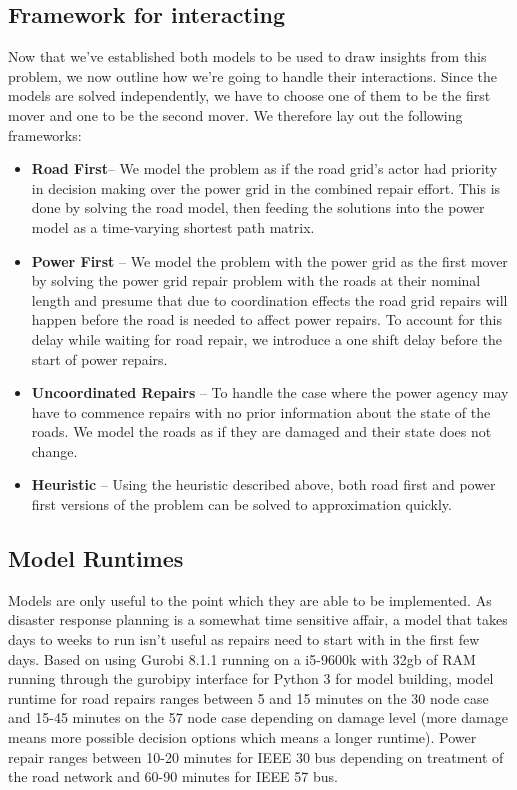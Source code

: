\documentclass{article}
\begin{document}
	\subsection{Framework for interacting}
	Now that we've established both models to be used to draw insights from this problem, we now outline how we're going to handle their interactions. Since the models are solved independently, we have to choose one of them to be the first mover and one to be the second mover. We therefore lay out the following frameworks:
	\begin{itemize}
		\item \textbf{Road First}-- We model the problem as if the road grid's actor had priority in decision making over the power grid in the combined repair effort. This is done by solving the road model, then feeding the solutions into the power model as a time-varying shortest path matrix.
		\item \textbf{Power First} -- We model the problem with the power grid as the first mover by solving the power grid repair problem with the roads at their nominal length and presume that due to coordination effects the road grid repairs will happen before the road is needed to affect power repairs. To account for this delay while waiting for road repair, we introduce a one shift delay before the start of power repairs.
		\item \textbf{Uncoordinated Repairs} -- To handle the case where the power agency may have to commence repairs with no prior information about the state of the roads. We model the roads as if they are damaged and their state does not change.
		\item \textbf{Heuristic} -- Using the heuristic described above, both road first and power first versions of the problem can be solved to approximation quickly.
	\end{itemize}
	\subsection{Model Runtimes}
	Models are only useful to the point which they are able to be implemented. As disaster response planning is a somewhat time sensitive affair, a model that takes days to weeks to run isn't useful as repairs need to start with in the first few days. Based on using Gurobi 8.1.1 running on a i5-9600k with 32gb of RAM running through the gurobipy interface for Python 3 for model building, model runtime for road repairs ranges between 5 and 15 minutes on the 30 node case and 15-45 minutes on the 57 node case depending on damage level (more damage means more possible decision options which means a longer runtime). Power repair ranges between 10-20 minutes for IEEE 30 bus depending on treatment of the road network and 60-90 minutes for IEEE 57 bus.
\end{document}
